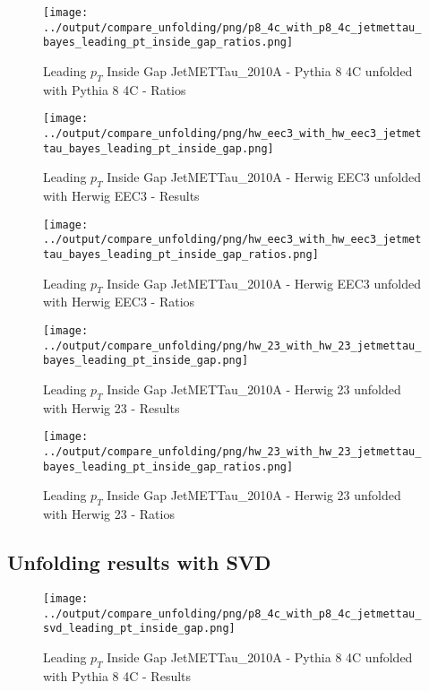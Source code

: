 \documentclass[11pt]{book}
\begin{document}
\begin{figure}[ht]
\centering
\texttt{[image: ../output/compare\_unfolding/png/p8\_4c\_with\_p8\_4c\_jetmettau\_bayes\_leading\_pt\_inside\_gap\_ratios.png]}
\caption{Leading $p_{T}$ Inside Gap JetMETTau\_2010A - Pythia 8 4C unfolded with Pythia 8 4C - Ratios}
\label{p8_p8_jetmettau_bayes_leading_pt_inside_gap_b}
\end{figure}

\begin{figure}[ht]
\centering
\texttt{[image: ../output/compare\_unfolding/png/hw\_eec3\_with\_hw\_eec3\_jetmettau\_bayes\_leading\_pt\_inside\_gap.png]}
\caption{Leading $p_{T}$ Inside Gap JetMETTau\_2010A - Herwig EEC3 unfolded with Herwig EEC3 - Results}
\label{hw_eec3_hw_eec3_jetmettau_bayes_leading_pt_inside_gap_a}
\end{figure}

\begin{figure}[ht]
\centering
\texttt{[image: ../output/compare\_unfolding/png/hw\_eec3\_with\_hw\_eec3\_jetmettau\_bayes\_leading\_pt\_inside\_gap\_ratios.png]}
\caption{Leading $p_{T}$ Inside Gap JetMETTau\_2010A - Herwig EEC3 unfolded with Herwig EEC3 - Ratios}
\label{hw_eec3_hw_eec3_jetmettau_bayes_leading_pt_inside_gap_b}
\end{figure}

\begin{figure}[ht]
\centering
\texttt{[image: ../output/compare\_unfolding/png/hw\_23\_with\_hw\_23\_jetmettau\_bayes\_leading\_pt\_inside\_gap.png]}
\caption{Leading $p_{T}$ Inside Gap JetMETTau\_2010A - Herwig 23 unfolded with Herwig 23 - Results}
\label{hw_23_hw_23_jetmettau_bayes_leading_pt_inside_gap_a}
\end{figure}

\begin{figure}[ht]
\centering
\texttt{[image: ../output/compare\_unfolding/png/hw\_23\_with\_hw\_23\_jetmettau\_bayes\_leading\_pt\_inside\_gap\_ratios.png]}
\caption{Leading $p_{T}$ Inside Gap JetMETTau\_2010A - Herwig 23 unfolded with Herwig 23 - Ratios}
\label{hw_23_hw_23_jetmettau_bayes_leading_pt_inside_gap_b}
\end{figure}

\clearpage
\subsection{Unfolding results with SVD}

\begin{figure}[ht]
\centering
\texttt{[image: ../output/compare\_unfolding/png/p8\_4c\_with\_p8\_4c\_jetmettau\_svd\_leading\_pt\_inside\_gap.png]}
\caption{Leading $p_{T}$ Inside Gap JetMETTau\_2010A - Pythia 8 4C unfolded with Pythia 8 4C - Results}
\label{p8_p8_jetmettau_svd_leading_pt_inside_gap_a}
\end{figure}
\end{document}
